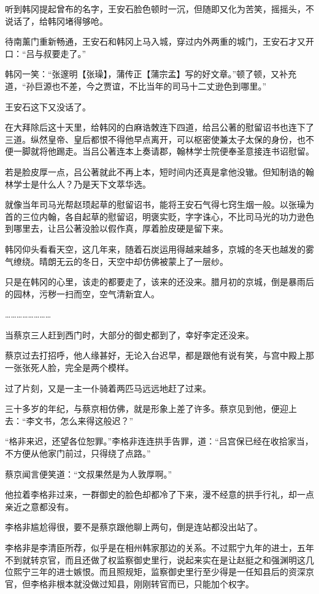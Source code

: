 听到韩冈提起曾布的名字，王安石脸色顿时一沉，但随即又化为苦笑，摇摇头，不说话了，给韩冈堵得够呛。

待南薰门重新畅通，王安石和韩冈上马入城，穿过内外两重的城门，王安石才又开口：“吕与叔要走了。”

韩冈一笑：“张邃明【张璪】，蒲传正【蒲宗孟】写的好文章。”顿了顿，又补充道，“孙巨源也不差，今之贾谊，不比当年的司马十二丈逊色到哪里。”

王安石这下又没话了。

在大拜除后这十天里，给韩冈的白麻诰敇连下四道，给吕公著的慰留诏书也连下了三道。纵然皇帝、皇后都恨不得他早点离开，可以枢密使兼太子太保的身份，也不便一脚就将他踢走。当吕公著连本上奏请郡，翰林学士院便奉圣意接连书诏慰留。

若是脸皮厚一点，吕公著就此不再上本，短时间内还真是拿他没辙。但知制诰的翰林学士是什么人？乃是天下文萃华选。

就像当年司马光帮赵顼起草的慰留诏书，能将王安石气得七窍生烟一般。以张璪为首的三位内翰，各自起草的慰留诏，明褒实贬，字字诛心，不比司马光的功力逊色到哪里去，让吕公著没脸以假作真，厚着脸皮硬是留下来。

韩冈仰头看看天空，这几年来，随着石炭运用得越来越多，京城的冬天也越发的雾气缭绕。晴朗无云的冬日，天空中却仿佛被蒙上了一层纱。

只是在韩冈的心里，该走的都要走了，该来的还没来。腊月初的京城，倒是暴雨后的园林，污秽一扫而空，空气清新宜人。

……………………

当蔡京三人赶到西门时，大部分的御史都到了，幸好李定还没来。

蔡京过去打招呼，他人缘甚好，无论入台迟早，都是跟他有说有笑，与宫中殿上那一张张死人脸，完全是两个模样。

过了片刻，又是一主一仆骑着两匹马远远地赶了过来。

三十多岁的年纪，与蔡京相仿佛，就是形象上差了许多。蔡京见到他，便迎上去：“李文书，怎么来得这般迟？”

“格非来迟，还望各位恕罪。”李格非连连拱手告罪，道：“吕宫保已经在收拾家当，不方便从他家门前过，只得绕了点路。”

蔡京闻言便笑道：“文叔果然是为人敦厚啊。”

他拉着李格非过来，一群御史的脸色却都冷了下来，漫不经意的拱手行礼，却一点亲近之意都没有。

李格非尴尬得很，要不是蔡京跟他聊上两句，倒是连站都没出站了。

李格非是李清臣所荐，似乎是在相州韩家那边的关系。不过熙宁九年的进士，五年不到就转京官，而且还做了权监察御史里行，说起来实在是让赵挺之和强渊明这几位熙宁三年的进士嫉恨。而且照规矩，监察御史里行至少得是一任知县后的资深京官，但李格非根本就没做过知县，刚刚转官而已，只能加个权字。

